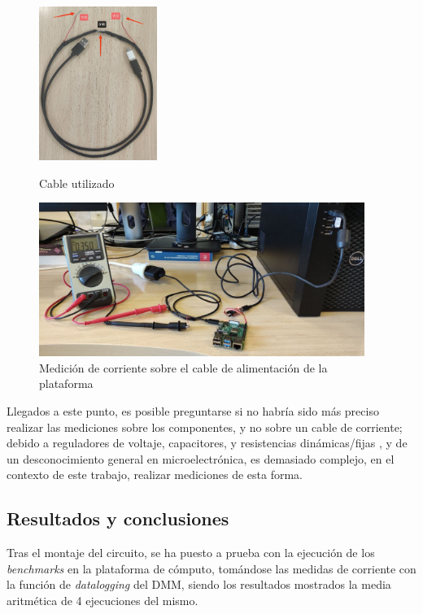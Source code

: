 \begin{figure}[H]
    \centering
    \begin{minipage}{0.29\textwidth}
    \centering
        \includegraphics[width=\textwidth, height=5cm]{figs/cable.jpg}
        \caption{Cable utilizado}
        \label{fig:montaje}
    \end{minipage}%
    \vspace*{\fill}
    \begin{minipage}{.69\textwidth}
        \includegraphics[width=\textwidth,height=5cm]{figs/dmm_intensidad.jpg}
        \caption{Medición de corriente sobre el cable de alimentación de la plataforma}
        \label{fig:intensidad}
    \end{minipage}
\end{figure}


Llegados a este punto, es posible preguntarse si no habría sido más preciso realizar las mediciones sobre los componentes, y no sobre un cable de corriente; debido a reguladores de voltaje, capacitores, y resistencias dinámicas/fijas \cite{schematics-rpi}, y de un desconocimiento general en microelectrónica, es demasiado complejo, en el contexto de este trabajo, realizar mediciones de esta forma. 

\subsection{Resultados y conclusiones}

Tras el montaje del circuito, se ha puesto a prueba con la ejecución de los \textit{benchmarks} en la plataforma de cómputo, tomándose las medidas de corriente con la función de \textit{datalogging} del \ac{DMM}, siendo los resultados mostrados la media aritmética de 4 ejecuciones del mismo.

